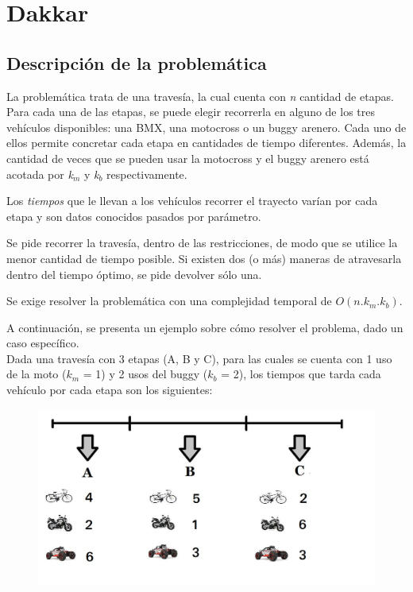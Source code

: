 \section{Dakkar}
\subsection{Descripci\'on de la problem\'atica}
La problem\'atica trata de una traves\'ia, la cual cuenta con \emph{n} cantidad de etapas. Para cada una de las etapas, se puede elegir recorrerla en alguno de los tres veh\'iculos disponibles: una BMX, una motocross o un buggy arenero. Cada uno de ellos permite concretar cada etapa en cantidades de tiempo diferentes.
Adem\'as, la cantidad de veces que se pueden usar la motocross y el buggy arenero est\'a acotada por \emph{k}$_m$ y \emph{k}$_b$ respectivamente.

Los \emph{tiempos} que le llevan a los veh\'iculos recorrer el trayecto var\'ian por cada etapa y son datos conocidos pasados por par\'ametro.

Se pide recorrer la traves\'ia, dentro de las restricciones, de modo que se utilice la menor cantidad de tiempo posible. Si existen dos (o m\'as) maneras de atravesarla dentro del tiempo
\'optimo, se pide devolver s\'olo una.

Se exige resolver la problem\'atica con una complejidad temporal de $O(n.k_m.k_b)$.\\

\bigskip

A continuaci\'on, se presenta un ejemplo sobre c\'omo resolver el problema, dado un caso espec\'ifico.\\

Dada una traves\'ia con 3 etapas (A, B y C), para las cuales se cuenta con 1 uso de la moto ($k_m$ = 1) y 2 usos del buggy ($k_b$ = 2), los tiempos que tarda cada veh\'iculo por cada etapa son los siguientes: \\

  \begin{figure}[h!]
   \begin{center}
 	\includegraphics[scale=0.4]{imagenes/ej1/ejemplo.png}
	\label{dibujitoAUTOS}
   \end{center}
 \end{figure}



